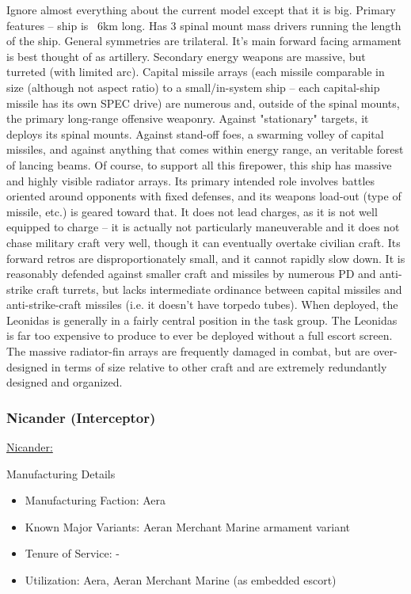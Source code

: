 Ignore almost everything about the current model except that it is
big.  Primary features -- ship is ~6km long. Has 3 spinal mount mass
drivers running the length of the ship. General symmetries are
trilateral. It's main forward facing armament is best thought of as
artillery. Secondary energy weapons are massive, but turreted (with
limited arc). Capital missile arrays (each missile comparable in size
(although not aspect ratio) to a small/in-system ship -- each
capital-ship missile has its own SPEC drive) are numerous and, outside
of the spinal mounts, the primary long-range offensive
weaponry. Against "stationary" targets, it deploys its spinal
mounts. Against stand-off foes, a swarming volley of capital missiles,
and against anything that comes within energy range, an veritable
forest of lancing beams. Of course, to support all this firepower,
this ship has massive and highly visible radiator arrays. Its primary
intended role involves battles oriented around opponents with fixed
defenses, and its weapons load-out (type of missile, etc.) is geared
toward that. It does not lead charges, as it is not well equipped to
charge -- it is actually not particularly maneuverable and it does not
chase military craft very well, though it can eventually overtake
civilian craft. Its forward retros are disproportionately small, and
it cannot rapidly slow down. It is reasonably defended against smaller
craft and missiles by numerous PD and anti-strike craft turrets, but
lacks intermediate ordinance between capital missiles and
anti-strike-craft missiles (i.e. it doesn't have torpedo tubes). When
deployed, the Leonidas is generally in a fairly central position in
the task group. The Leonidas is far too expensive to produce to ever
be deployed without a full escort screen. The massive radiator-fin
arrays are frequently damaged in combat, but are over-designed in terms
of size relative to other craft and are extremely redundantly designed
and organized.


\subsubsection{Nicander (Interceptor)}

\href{http://vegastrike.sourceforge.net/wiki/Vessel:Nicander}{Nicander:}

Manufacturing Details
\begin{itemize}
\item Manufacturing Faction: Aera
\item Known Major Variants: Aeran Merchant Marine armament variant
\item Tenure of Service: -
\item Utilization: Aera, Aeran Merchant Marine (as embedded escort)
\end{itemize}

